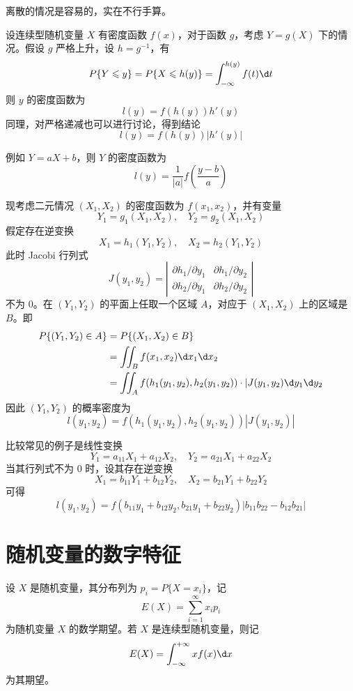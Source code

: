 离散的情况是容易的，实在不行手算。

设连续型随机变量 $X$ 有密度函数 $f(x)$，对于函数 $g$，考虑 $Y=g(X)$ 下的情况。假设 $g$ 严格上升，设 $h = g^{-1}$，有
\[ P\{Y \leqslant y\} = P\{X \leqslant h(y)\} = \int_{-\infty}^{h(y)} f(t) \d t \]
则 $y$ 的密度函数为
\[ l(y) = f(h(y)) h'(y) \]
同理，对严格递减也可以进行讨论，得到结论
\[ l(y) = f(h(y)) |h'(y)| \]

例如 $Y = aX+b$，则 $Y$ 的密度函数为
\[ l(y) = \frac{1}{|a|}f\left(\frac{y-b}{a}\right) \]

现考虑二元情况 $(X_1, X_2)$ 的密度函数为 $f(x_1, x_2)$，并有变量
\[ Y_1 = g_1(X_1, X_2), \quad Y_2 = g_2(X_1, X_2) \]
假定存在逆变换
\[ X_1 = h_1(Y_1, Y_2), \quad X_2 = h_2(Y_1, Y_2) \]
此时 Jacobi 行列式
\[ J(y_1, y_2) = \left|\begin{matrix}
		\partial h_1 / \partial y_1 & \partial h_1 / \partial y_2 \\
		\partial h_2 / \partial y_1 & \partial h_2 / \partial y_2
	\end{matrix}\right| \]
不为 $0$。在 $(Y_1, Y_2)$ 的平面上任取一个区域 $A$，对应于 $(X_1, X_2)$ 上的区域是 $B$。即
\[ \begin{aligned}
		P\{(Y_1, Y_2) \in A\} & = P\{(X_1, X_2) \in B\}                                                      \\
		                      & = \iint_{B} f(x_1, x_2) \d x_1 \d x_2                                        \\
		                      & = \iint_{A} f(h_1(y_1, y_2), h_2(y_1, y_2)) \cdot |J(y_1, y_2) \d y_1 \d y_2
	\end{aligned} \]
因此 $(Y_1, Y_2)$ 的概率密度为
\[ l(y_1, y_2) = f(h_1(y_1, y_2), h_2(y_1, y_2)) | J(y_1, y_2)| \]

比较常见的例子是线性变换
\[ Y_1 = a_{11} X_1 + a_{12} X_2, \quad Y_2 = a_{21} X_1 + a_{22} X_2 \]
当其行列式不为 $0$ 时，设其存在逆变换
\[ X_1 = b_{11} Y_1 + b_{12} Y_2, \quad X_2 = b_{21} Y_1 + b_{22} Y_2 \]
可得
\[ l(y_1, y_2) = f(b_{11} y_1 + b_{12} y_2, b_{21} y_1 + b_{22} y_2) | b_{11} b_{22} - b_{12} b_{21} | \]

\section{随机变量的数字特征}

设 $X$ 是随机变量，其分布列为 $p_i = P\{X = x_i\}$，记
\[ E(X) = \sum_{i=1}^\infty x_i p_i \]
为随机变量 $X$ 的数学期望。若 $X$ 是连续型随机变量，则记
\[ E(X) = \int_{-\infty}^{+\infty} x f(x) \d x \]
为其期望。

